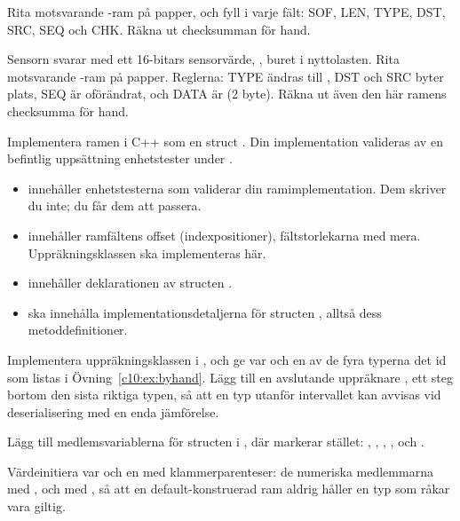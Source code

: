  Rita motsvarande -ram på papper, och fyll i varje fält: SOF, LEN, TYPE,
DST, SRC, SEQ och CHK. Räkna ut checksumman för hand.

 Sensorn svarar med ett 16-bitars sensorvärde, , buret i nyttolasten. Rita
motsvarande -ram på papper. Reglerna: TYPE ändras till , DST och
SRC byter plats, SEQ är oförändrat, och DATA är  (2 byte). Räkna ut även den här ramens
checksumma för hand.

\label{c10:ex:cpp}
Implementera ramen i C++ som en struct . Din implementation valideras av en
befintlig uppsättning enhetstester under .

\begin{itemize}
  \item {} innehåller enhetstesterna som validerar din ramimplementation. Dem
    skriver du inte; du får dem att passera.
  \item {} innehåller ramfältens offset (indexpositioner), fältstorlekarna
    med mera. Uppräkningsklassen  ska implementeras här.
  \item {} innehåller deklarationen av structen .
  \item {} ska innehålla implementationsdetaljerna för structen
    , alltså dess metoddefinitioner.
\end{itemize}

Implementera uppräkningsklassen  i , och ge var och en av
de fyra typerna det id som listas i Övning~\ref{c10:ex:byhand}. Lägg till en avslutande uppräknare
, ett steg bortom den sista riktiga typen, så att en typ utanför intervallet kan
avvisas vid deserialisering med en enda jämförelse.

Lägg till medlemsvariablerna för structen  i , där
 markerar stället: , ,
, ,  och .

Värdeinitiera var och en med klammerparenteser: de numeriska medlemmarna med \code{\{\}}, och
 med , så att en default-konstruerad ram aldrig håller en typ
som råkar vara giltig.

